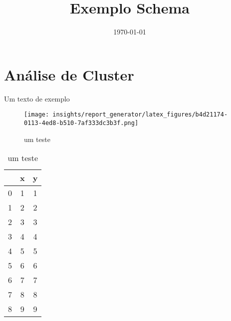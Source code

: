 \documentclass{article}%
\title{Exemplo Schema}%
\date{\today}%
\begin{document}
%
\normalsize%
\maketitle%
\clearpage%
\section{Análise de Cluster}%
\label{sec:AnlisedeCluster}%
Um texto de exemplo%
\newline%


\begin{figure}%
\centering%
\texttt{[image: insights/report\_generator/latex\_figures/b4d21174-0113-4ed8-b510-7af333dc3b3f.png]}%
\caption{um teste}%
\end{figure}

%


\begin{table}[htbp]%
\caption{um teste}%
\centering%
\begin{tabular}{ccc}
\toprule
{} &  x &  y \\
\midrule
0 &  1 &  1 \\
1 &  2 &  2 \\
2 &  3 &  3 \\
3 &  4 &  4 \\
4 &  5 &  5 \\
5 &  6 &  6 \\
6 &  7 &  7 \\
7 &  8 &  8 \\
8 &  9 &  9 \\
\bottomrule
\end{tabular}
%
\end{table}

%
\FloatBarrier%
\end{document}
